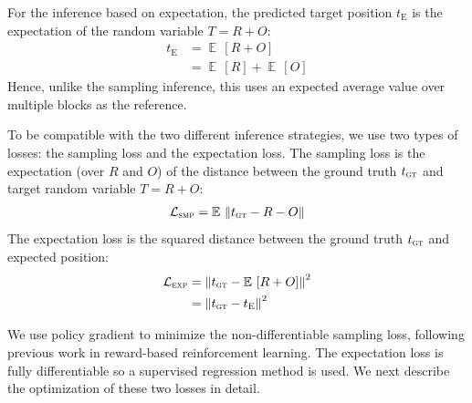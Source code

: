 \documentclass[letterpaper]{article} %
\DeclareMathOperator{\E}{\mathbb{E}\,}
\begin{document}
For the inference based on expectation, the predicted target position $t_\text{E}$ is the expectation of the random variable $T = R+O$:
\begin{align}
t_\text{E} & = \E\left[R + O\right] \\
& = \E \left[R\right] + \E\left[O\right]
\end{align}
Hence, unlike the sampling inference, this uses an expected average value over multiple blocks as the reference.

To be compatible with the two different inference strategies, we use two types of losses: the sampling loss and the expectation loss.
The sampling loss is the expectation (over $R$ and $O$) of the distance between the ground truth $t_\textsc{gt}$ and target random variable $T = R+O$:
\begin{align}
\label{sampling loss}
\mathcal{L}_\textsc{smp}  = \E \left \Vert t_\textsc{gt} - R - O \right \Vert
\end{align}
The expectation loss is the squared distance between the ground truth $t_\textsc{gt}$ and expected position:
\begin{align}
\label{expectation loss}
\mathcal{L}_\textsc{exp} &=\left \Vert t_\textsc{gt} - \E\left[ R+O \right] \right \Vert^2\\
&= \left \Vert t_\textsc{gt} - t_\textsc{E} \right \Vert^2
\end{align}

We use policy gradient to minimize the non-differentiable sampling loss, following previous work in reward-based reinforcement learning.
The expectation loss is fully differentiable so a supervised regression method is used. We next describe the optimization of these two losses in detail.
\end{document}

